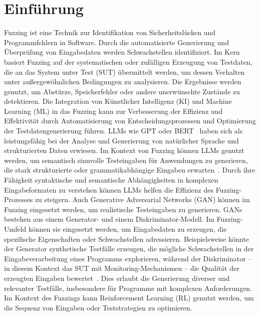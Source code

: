 
\section{Einführung}\label{sec:introduction}
Fuzzing ist eine Technik zur Identifikation von Sicherheitslücken und Programmfehlern in Software.
Durch die automatisierte Generierung und Überprüfung von Eingabedaten werden Schwachstellen identifiziert.
Im Kern basiert Fuzzing auf der systematischen oder zufälligen Erzeugung von Testdaten, die an das System unter Test (SUT) übermittelt
werden, um dessen Verhalten unter außergewöhnlichen Bedingungen zu analysieren.
Die Ergebnisse werden genutzt, um Abstürze, Speicherfehler oder andere unerwünschte Zustände zu detektieren.\newline
Die Integration von Künstlicher Intelligenz (KI) und Machine Learning (ML) in das Fuzzing kann zur Verbesserung der
Effizienz und Effektivität durch Automatisierung von Entscheidungsprozessen und Optimierung der Testdatengenerierung führen.
LLMs wie GPT oder BERT~\cite{devlin_bert_2019} haben sich als leistungsfähig bei der Analyse und Generierung von natürlicher Sprache und
strukturierten Daten erwiesen.\newline
Im Kontext von Fuzzing können LLMs genutzt werden, um semantisch sinnvolle Testeingaben für Anwendungen zu generieren,
die stark strukturierte oder grammatikabhängige Eingaben erwarten~\citet{deng_large_2023}.
Durch ihre Fähigkeit syntaktische und semantische Abhängigkeiten in komplexen Eingabeformaten zu verstehen können LLMs helfen
die Effizienz des Fuzzing-Prozesses zu steigern.\newline
Auch Generative Adversarial Networks (GAN) können im Fuzzing eingesetzt werden, um realistische Testeingaben zu generieren.
GANs bestehen aus einem Generator- und einem Diskriminator-Modell.
Im Fuzzing-Umfeld können sie eingesetzt werden, um Eingabedaten zu erzeugen, die spezifische Eigenschaften oder Schwachstellen
adressieren.
Beispielsweise könnte der Generator synthetische Testfälle erzeugen, die mögliche Schwachstellen in der Eingabeverarbeitung
eines Programms explorieren, während der Diskriminator -- in diesem Kontext das SUT mit Monitoring-Mechanismen -- die Qualität
der erzeugten Eingaben bewertet~\citet{devlin_bert_2019}.
Dies erlaubt die Generierung diverser und relevanter Testfälle, insbesondere für Programme mit komplexen Anforderungen.\newline
Im Kontext des Fuzzings kann Reinforcement Learning (RL) genutzt werden, um die Sequenz von Eingaben oder Teststrategien zu optimieren.
